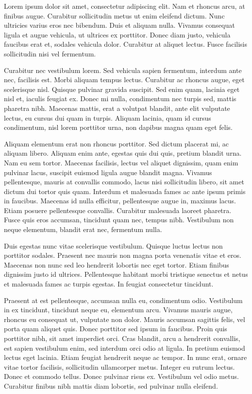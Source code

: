 \begin{preface}

Lorem ipsum dolor sit amet, consectetur adipiscing elit. Nam et rhoncus arcu, at finibus augue. Curabitur sollicitudin metus ut enim eleifend dictum. Nunc ultricies varius eros nec bibendum. Duis et aliquam nulla. Vivamus consequat ligula et augue vehicula, ut ultrices ex porttitor. Donec diam justo, vehicula faucibus erat et, sodales vehicula dolor. Curabitur at aliquet lectus. Fusce facilisis sollicitudin nisi vel fermentum.

Curabitur nec vestibulum lorem. Sed vehicula sapien fermentum, interdum ante nec, facilisis est. Morbi aliquam tempus lectus. Curabitur ac rhoncus augue, eget scelerisque nisl. Quisque pulvinar gravida suscipit. Sed enim quam, lacinia eget nisl et, iaculis feugiat ex. Donec mi nulla, condimentum nec turpis sed, mattis pharetra nibh. Maecenas mattis, erat a volutpat blandit, ante elit vulputate lectus, eu cursus dui quam in turpis. Aliquam lacinia, quam id cursus condimentum, nisl lorem porttitor urna, non dapibus magna quam eget felis.

Aliquam elementum erat non rhoncus porttitor. Sed dictum placerat mi, ac aliquam libero. Aliquam enim ante, egestas quis dui quis, pretium blandit urna. Nam eu sem tortor. Maecenas facilisis, lectus vel aliquet dignissim, quam enim pulvinar lacus, suscipit euismod ligula augue blandit magna. Vivamus pellentesque, mauris at convallis commodo, lacus nisi sollicitudin libero, sit amet dictum dui tortor quis quam. Interdum et malesuada fames ac ante ipsum primis in faucibus. Maecenas id nulla efficitur, pellentesque augue in, maximus lacus. Etiam posuere pellentesque convallis. Curabitur malesuada laoreet pharetra. Fusce quis eros accumsan, tincidunt quam nec, tempus nibh. Vestibulum non neque elementum, blandit erat nec, fermentum nulla.

Duis egestas nunc vitae scelerisque vestibulum. Quisque luctus lectus non porttitor sodales. Praesent nec mauris non magna porta venenatis vitae et eros. Maecenas non nunc sed leo hendrerit lobortis nec eget tortor. Etiam finibus dignissim justo id ultrices. Pellentesque habitant morbi tristique senectus et netus et malesuada fames ac turpis egestas. In feugiat consectetur tincidunt.

Praesent at est pellentesque, accumsan nulla eu, condimentum odio. Vestibulum in ex tincidunt, tincidunt neque eu, elementum arcu. Vivamus mauris augue, rhoncus eu consequat ut, vulputate non dolor. Mauris accumsan sagittis felis, vel porta quam aliquet quis. Donec porttitor sed ipsum in faucibus. Proin quis porttitor nibh, sit amet imperdiet orci. Cras blandit, arcu a hendrerit convallis, est sapien vestibulum enim, sed interdum orci odio at ligula. In pretium euismod lectus eget lacinia. Etiam feugiat hendrerit neque ac tempor. In nunc erat, ornare vitae tortor facilisis, sollicitudin ullamcorper metus. Integer eu rutrum lectus. Donec et commodo tellus. Donec pulvinar risus ex. Vestibulum vel odio metus. Curabitur finibus nibh mattis diam lobortis, sed pulvinar nulla eleifend.

\end{preface}
